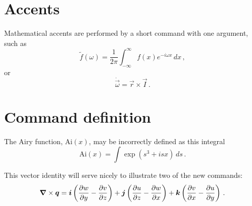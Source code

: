 \documentclass[12pt,a4paper]{article}
\begin{document}
\section{Accents}

Mathematical accents are performed by a short command with one 
argument, such as
\begin{displaymath}
	\tilde f(\omega)=\frac{1}{2\pi}
	\int_{-\infty}^\infty f(x)e^{-i\omega x}\,dx\,,
\end{displaymath}
or
\begin{displaymath}
	\dot{\vec \omega}=\vec r\times\vec I\,.
\end{displaymath}





\section{Command definition}

\newcommand{\Ai}{\mbox{Ai}} 
The Airy function, $\Ai(x)$, may be incorrectly defined as this 
integral
\begin{displaymath}
	\Ai(x)=\int\exp(s^3+isx)\,ds\,.
\end{displaymath}

\newcommand{\D}[2]{\frac{\partial #2}{\partial #1}}
\newcommand{\DD}[2]{\frac{\partial^2 #2}{\partial #1^2}}
\renewcommand{\vec}[1]{\mbox{\boldmath$#1$}}
This vector identity will serve nicely to illustrate two of the new 
commands:
\begin{displaymath}
	\vec\nabla\times\vec q
	=\vec i\left(\D yw-\D zv\right)
	+\vec j\left(\D zu-\D xw\right)
	+\vec k\left(\D xv-\D yu\right)\,.
\end{displaymath}
\end{document}
